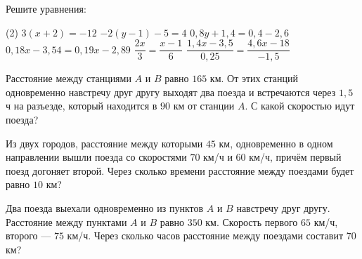 \begin{homework}[number=1]
	\begin{listofex}
		\item Решите уравнения: %
		\begin{tasks}(2)
			\task \( 3(x+2)=-12 \)
			\task \( -2(y-1)-5=4 \)
			\task \( 0,8y+1,4=0,4-2,6 \)
			\task \( 0,18x-3,54=0,19x-2,89 \)
			\task \( \dfrac{ 2x }{ 3 }=\dfrac{ x-1 }{6  } \)
			\task \( \dfrac{ 1,4x-3,5 }{ 0,25 }=\dfrac{ 4,6x-18 }{ -1,5 } \)
		\end{tasks}
		\item Расстояние между станциями \(A\) и \(B\) равно \(165\) км. От этих станций одновременно навстречу друг другу выходят два поезда и встречаются через \(1,5\) ч на разъезде, который находится в \(90\) км от станции \(A\). С какой скоростью идут поезда?
		\item Из двух городов, расстояние между которыми \(45\) км, одновременно в одном направлении вышли поезда со скоростями \(70\) км/ч и \(60\) км/ч, причём первый поезд догоняет второй. Через сколько времени расстояние между поездами будет равно \(10\) км?
		\item Два поезда выехали одновременно из пунктов \(A\) и \(B\) навстречу друг другу. Расстояние между пунктами \(A\) и \(B\) равно \(350\) км. Скорость первого \(65\) км/ч, второго --- \(75\) км/ч. Через сколько часов расстояние между поездами составит \(70\) км?
	\end{listofex}
\end{homework}

